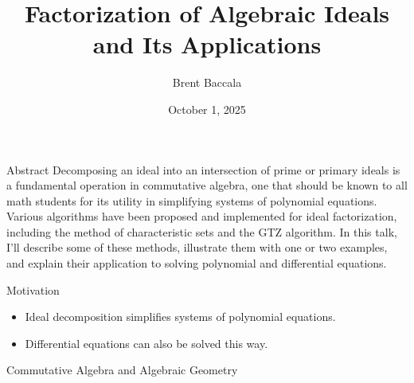 \documentclass[11pt]{beamer}
\title[Factorization of Ideals]{Factorization of Algebraic Ideals and Its Applications}
\author{Brent Baccala}
\institute{\tt cosine@freesoft.org}
\date{October 1, 2025}
\begin{document}
\begin{frame}
  \titlepage


\begin{block}{Abstract}
\tiny
Decomposing an ideal into an intersection of prime or primary ideals is a fundamental operation in commutative algebra, one that should be known to all math students for its utility in simplifying systems of polynomial equations.  Various algorithms have been proposed and implemented for ideal factorization, including the method of characteristic sets and the GTZ algorithm.  In this talk, I'll describe some of these methods, illustrate them with one or two examples, and explain their application to solving polynomial and differential equations.
\end{block}

\end{frame}

\begin{frame}{Motivation}
\begin{itemize}
  \item Ideal decomposition simplifies systems of polynomial equations.
  \item Differential equations can also be solved this way.
\end{itemize}
\end{frame}

\begin{frame}{Commutative Algebra and Algebraic Geometry}
\small
\centering
{}
\end{frame}
\end{document}

